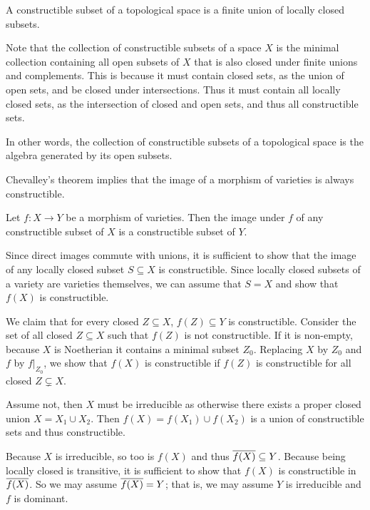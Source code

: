 \bdefn

    A {\emphcolor constructible} subset of a topological space is a finite union of locally closed subsets.

\edefn

Note that the collection of constructible subsets of a space $X$ is the minimal collection containing all open subsets
of $X$ that is also closed under finite unions and complements.
This is because it must contain closed sets, as the union of open sets, and be closed under intersections.
Thus it must contain all locally closed sets, as the intersection of closed and open sets, and thus all
constructible sets.

In other words, the collection of constructible subsets of a topological space is the algebra generated by its open subsets.

Chevalley's theorem implies that the image of a morphism of varieties is always constructible.

\bthrm[title={Chevalley}]

    Let $f\colon X\to Y$ be a morphism of varieties.
    Then the image under $f$ of any constructible subset of $X$ is a constructible subset of $Y$.

\ethrm

\bproof

    Since direct images commute with unions, it is sufficient to show that the image of any locally closed subset $S\subseteq X$
    is constructible.
    Since locally closed subsets of a variety are varieties themselves, we can assume that $S=X$ and show that $f(X)$ is
    constructible.

    We claim that for every closed $Z\subseteq X$, $f(Z)\subseteq Y$ is constructible.
    Consider the set of all closed $Z\subseteq X$ such that $f(Z)$ is not constructible.
    If it is non-empty, because $X$ is Noetherian it contains a minimal subset $Z_0$.
    Replacing $X$ by $Z_0$ and $f$ by $f|_{Z_0}$, we show that $f(X)$ is constructible if $f(Z)$ is constructible for all closed
    $Z\subsetneq X$.

    Assume not, then $X$ must be irreducible as otherwise there exists a proper closed union $X=X_1\cup X_2$.
    Then $f(X)=f(X_1)\cup f(X_2)$ is a union of constructible sets and thus constructible.

    Because $X$ is irreducible, so too is $f(X)$ and thus ${\overline{f(X)}}\subseteq Y$.
    Because being locally closed is transitive, it is sufficient to show that $f(X)$ is constructible in ${\overline{f(X)}}$.
    So we may assume ${\overline{f(X)}}=Y$; that is, we may assume $Y$ is irreducible and $f$ is dominant.

